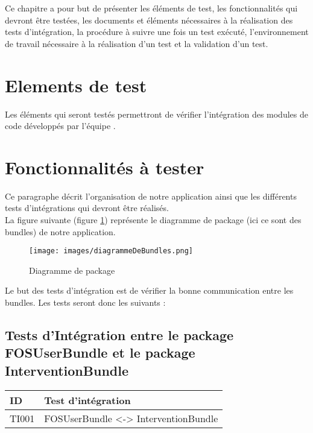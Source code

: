   
  Ce chapitre a pour but de présenter les éléments de test, les fonctionnalités qui devront être testées, les documents et éléments nécessaires à la réalisation des tests d'intégration, la procédure à suivre une fois un test exécuté, l'environnement de travail nécessaire à la réalisation d'un test et la validation d'un test. 
 
 
  \section{Elements de test}
 	Les éléments qui seront testés permettront de vérifier l'intégration des modules de code développés par l'équipe \nomEquipe.
 	
 \section{Fonctionnalités à tester}
 	Ce paragraphe décrit l'organisation de notre application ainsi que les différents tests d'intégrations qui devront être réalisés. \\
 	
 	La figure suivante (figure \ref{diagrammeDeBundles}) représente le diagramme de package (ici ce sont des bundles) de notre application.
 	\begin{figure}[H]
 		\centering
 		\texttt{[image: images/diagrammeDeBundles.png]}
 		\caption{Diagramme de package}
 		\label{diagrammeDeBundles}
 	\end{figure}
 	
 	Le but des tests d'intégration est de vérifier la bonne communication entre les bundles. Les tests seront donc les suivants :
 	
 	\subsection*{Tests d'Intégration entre le package FOSUserBundle et le package InterventionBundle}
 	
 	\begin{center}
    		\begin{tabular}[h]{|p{}|p{}|}
		\hline
			ID & Test d'intégration \\\hline
			TI001 & FOSUserBundle <-> InterventionBundle \\\hline
    	 	\end{tabular}
  	\end{center}
  	
